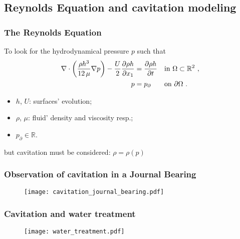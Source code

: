 \documentclass[10pt,aspectratio=169]{beamer}
\begin{document}

\subsection{Reynolds Equation and cavitation modeling}


\begin{frame}
\frametitle{The Reynolds Equation}\bigskip
To look for the hydrodynamical pressure $p$ such that
\begin{align*}
\nabla \cdot \left( \frac{\rho h^3}{12\,\mu} \nabla p \right)- \frac{U}{2}\frac{\partial \rho h }{\partial x_1} &=\frac{\partial \rho h }{\partial t} &&\text{in } \Omega\subset \mathbb{R}^2~,\\
p&=p_\partial&&\text{on } \partial \Omega~.
\end{align*} 
\begin{itemize}
	\item $h$, $U$: surfaces' evolution;
	\item $\rho$, $\mu$: fluid' density and viscosity resp.;
	\item $p_\partial\in \mathbb{R}$.
\end{itemize}

\begin{center}
	but cavitation must be considered: $\rho=\rho(p)$
\end{center}
\end{frame}


\begin{frame}[noframenumbering]
\frametitle{Observation of cavitation in a Journal Bearing}
\vspace*{1.0cm}
\begin{figure}
	\centering
	\texttt{[image: cavitation\_journal\_bearing.pdf]}
\end{figure}
\end{frame}


\begin{frame}
\frametitle{Cavitation and water treatment}
\vspace*{0.5cm}
\begin{minipage}{\linewidth}
\begin{figure}
	\texttt{[image: water\_treatment.pdf]}
\end{figure}
\end{minipage}
\end{frame}
\end{document}
